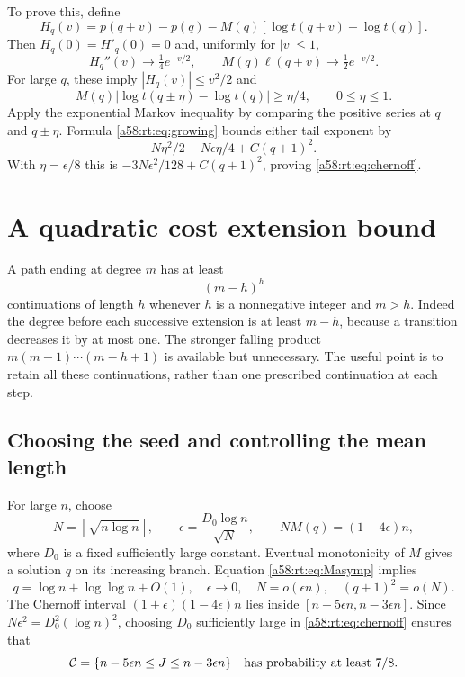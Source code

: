 \documentclass[11pt,letterpaper]{article}
\theoremstyle{remark}
\begin{document}
To prove this, define
\[
 H_q(v)=p(q+v)-p(q)-M(q)[\log t(q+v)-\log t(q)].
\]
Then $H_q(0)=H'_q(0)=0$ and, uniformly for $|v|\le1$,
\[
 H_q''(v)\longrightarrow\tfrac14e^{-v/2},\qquad
 M(q)\ell(q+v)\longrightarrow\tfrac12e^{-v/2}.
\]
For large $q$, these imply $|H_q(v)|\le v^2/2$ and
\[
 M(q)|\log t(q\pm\eta)-\log t(q)|\ge\eta/4,
 \qquad0\le\eta\le1.
\]
Apply the exponential Markov inequality by comparing the positive series
at $q$ and $q\pm\eta$. Formula \eqref{a58:rt:eq:growing} bounds either tail
exponent by
\[
 N\eta^2/2-N\epsilon\eta/4+C(q+1)^2.
\]
With $\eta=\epsilon/8$ this is
$-3N\epsilon^2/128+C(q+1)^2$, proving \eqref{a58:rt:eq:chernoff}.

\section{A quadratic cost extension bound}\label{a58:rt:sec:extension}
A path ending at degree $m$ has at least
\begin{equation}\label{a58:rt:eq:continuations}
 (m-h)^h
\end{equation}
continuations of length $h$ whenever $h$ is a nonnegative integer and
$m>h$. Indeed the degree before each successive extension is at least
$m-h$, because a transition decreases it by at most one. The stronger
falling product $m(m-1)\cdots(m-h+1)$ is available but unnecessary.
The useful point is to retain all these continuations, rather than one
prescribed continuation at each step.

\subsection{Choosing the seed and controlling the mean length}
For large $n$, choose
\begin{equation}\label{a58:rt:eq:seedchoice}
 N=\left\lceil\sqrt{n\log n}\right\rceil,\qquad
 \epsilon=\frac{D_0\log n}{\sqrt N},\qquad
 NM(q)=(1-4\epsilon)n,
\end{equation}
where $D_0$ is a fixed sufficiently large constant. Eventual monotonicity
of $M$ gives a solution $q$ on its increasing branch. Equation
\eqref{a58:rt:eq:Masymp} implies
\begin{equation}\label{a58:rt:eq:scales}
 q=\log n+\log\log n+O(1),\quad \epsilon\to0,\quad
 N=o(\epsilon n),\quad (q+1)^2=o(N).
\end{equation}
The Chernoff interval $(1\pm\epsilon)(1-4\epsilon)n$ lies inside
$[n-5\epsilon n,n-3\epsilon n]$. Since
$N\epsilon^2=D_0^2(\log n)^2$, choosing $D_0$ sufficiently large in
\eqref{a58:rt:eq:chernoff} ensures that
\begin{equation}\label{a58:rt:eq:central}
 \mathcal C=\{n-5\epsilon n\le J\le n-3\epsilon n\}
 \quad\hbox{has probability at least }7/8.
\end{equation}
\end{document}
